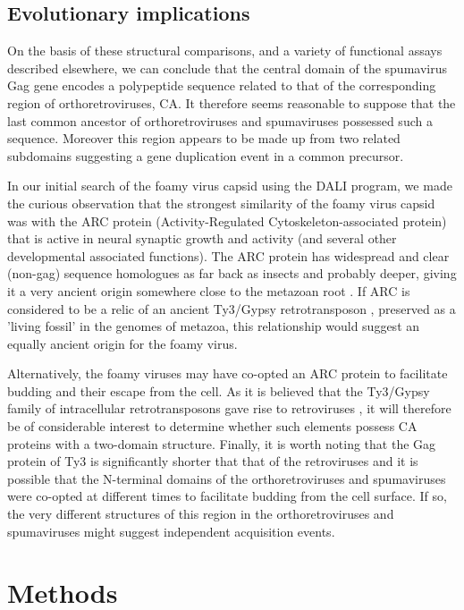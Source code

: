 \documentclass[preprint,12pt]{elsarticle}
\begin{document}
\subsection{Evolutionary implications}

On the basis of these structural comparisons, and a variety of functional assays described elsewhere, we can
conclude that the central domain of the spumavirus Gag gene encodes a polypeptide sequence related to that of
the corresponding region of orthoretroviruses, CA. It therefore seems reasonable to suppose that the last
common ancestor of orthoretroviruses and spumaviruses possessed such a sequence. Moreover this region appears
to be made up from two related subdomains suggesting a gene duplication event in a common precursor.

In our initial search of the foamy virus capsid using the DALI program, we made
the curious observation that the strongest similarity of the foamy virus capsid
was with the ARC protein (Activity-Regulated Cytoskeleton-associated protein) that
is active in neural synaptic growth and activity (and several other developmental associated functions).
The ARC protein has widespread and clear (non-gag) sequence homologues as far back as insects and probably
deeper, giving it a very ancient origin somewhere close to the metazoan root \cite{CampillosMet06}.
If ARC is considered to be a relic of an ancient Ty3/Gypsy retrotransposon \cite{ZhangWet15}, preserved
as a 'living fossil' in the genomes of metazoa, this relationship would suggest an equally
ancient origin for the foamy virus.

Alternatively,
the foamy viruses may have co-opted an ARC protein to facilitate budding and their escape from the cell.
As it is believed that the Ty3/Gypsy family of intracellular retrotransposons gave rise to retroviruses
\cite{LlorensCet08},
it will therefore be of considerable interest to determine whether such elements possess CA proteins with
a two-domain structure. Finally, it is worth noting that the Gag protein of Ty3 is significantly shorter
that that of the retroviruses and it is possible that the N-terminal domains of the orthoretroviruses
and spumaviruses were co-opted at different times to facilitate budding from the cell surface.
If so, the very different structures of this region in the orthoretroviruses and spumaviruses might suggest
independent acquisition events.

\section{Methods}
\end{document}
